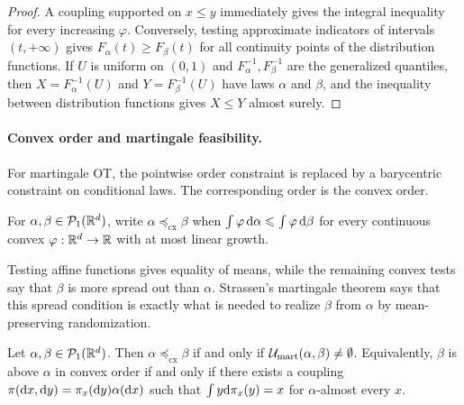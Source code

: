 \begin{proof}
	A coupling supported on $x\leq y$ immediately gives the integral inequality for every increasing $\varphi$. Conversely, testing approximate indicators of intervals $(t,+\infty)$ gives $F_\alpha(t)\geq F_\beta(t)$ for all continuity points of the distribution functions. If $U$ is uniform on $(0,1)$ and $F_\alpha^{-1},F_\beta^{-1}$ are the generalized quantiles, then $X=F_\alpha^{-1}(U)$ and $Y=F_\beta^{-1}(U)$ have laws $\alpha$ and $\beta$, and the inequality between distribution functions gives $X\leq Y$ almost surely.
\end{proof}

\paragraph{Convex order and martingale feasibility.}
For martingale OT, the pointwise order constraint is replaced by a barycentric constraint on conditional laws. The corresponding order is the convex order.
\begin{defn}\label{def-convex-order}
For $\alpha,\beta\in\mathcal{P}_1(\mathbb{R}^d)$, write $\alpha\preceq_{\mathrm{cx}}\beta$ when
$\int \varphi\,\mathrm{d}\alpha\leqslant\int \varphi\,\mathrm{d}\beta$
for every continuous convex $\varphi:\mathbb{R}^d\to\mathbb{R}$ with at most linear growth.
\end{defn}
Testing affine functions gives equality of means, while the remaining convex tests say that $\beta$ is more spread out than $\alpha$. Strassen's martingale theorem says that this spread condition is exactly what is needed to realize $\beta$ from $\alpha$ by mean-preserving randomization.

\begin{thm}\label{thm-strassen-martingale}
	Let $\alpha,\beta\in\mathcal{P}_1(\mathbb{R}^d)$. Then
	$\alpha\preceq_{\mathrm{cx}}\beta$ if and only if $\mathcal{U}_{\mathrm{mart}}(\alpha,\beta)\neq\emptyset$.
	Equivalently, $\beta$ is above $\alpha$ in convex order if and only if there exists a coupling $\pi(\mathrm{d} x,\mathrm{d} y)=\pi_x(\mathrm{d} y)\alpha(\mathrm{d} x)$ such that $\int y\mathrm{d}\pi_x(y)=x$ for $\alpha$-almost every $x$.
\end{thm}

